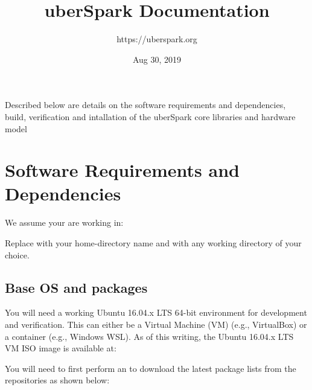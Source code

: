 \documentclass[letterpaper,10pt,english]{sphinxmanual}
\title{uberSpark Documentation}
\date{Aug 30, 2019}
\author{https://uberspark.org}
\begin{document}
\pagestyle{empty}
\sphinxmaketitle
\pagestyle{plain}
\sphinxtableofcontents
\pagestyle{normal}
\label{\detokenize{index::doc}}


Described below are details on the software requirements and
dependencies, build, verification and intallation of the uberSpark core
libraries and hardware model


\chapter{Software Requirements and Dependencies}
\label{\detokenize{sw-requirements:software-requirements-and-dependencies}}\label{\detokenize{sw-requirements::doc}}
We assume your are working in: 

Replace  with your home-directory name and 
with any working directory of your choice.


\section{Base OS and packages}
\label{\detokenize{sw-requirements:base-os-and-packages}}
You will need a working Ubuntu 16.04.x LTS 64-bit environment for development and
verification. This can either be a Virtual Machine (VM) (e.g., VirtualBox) or a
container (e.g., Windows WSL). As of this writing, the Ubuntu 16.04.x LTS VM ISO
image is available at:

\begin{sphinxVerbatim}[commandchars=\\\{\}]
\end{sphinxVerbatim}

You will need to first perform an  to download the latest package
lists from the repositories as shown below:

\begin{sphinxVerbatim}[commandchars=\\\{\}]
  
\end{sphinxVerbatim}
\end{document}
